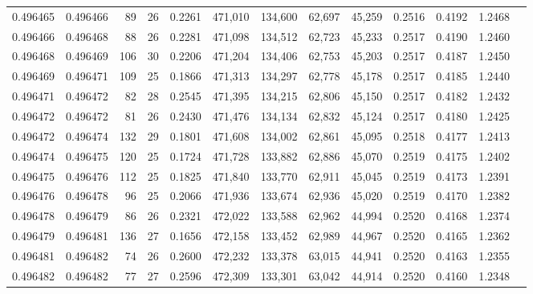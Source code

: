 \begin{tabular}{rrrrrrrrrrrrr}
0.496465 & 0.496466 &  89 &  26 &                                     0.2261 & 471,010 & 134,600 &  62,697 &  45,259 & 0.2516 & 0.4192 & 1.2468 \\
0.496466 & 0.496468 &  88 &  26 &                                     0.2281 & 471,098 & 134,512 &  62,723 &  45,233 & 0.2517 & 0.4190 & 1.2460 \\
0.496468 & 0.496469 & 106 &  30 &                                     0.2206 & 471,204 & 134,406 &  62,753 &  45,203 & 0.2517 & 0.4187 & 1.2450 \\
0.496469 & 0.496471 & 109 &  25 &                                     0.1866 & 471,313 & 134,297 &  62,778 &  45,178 & 0.2517 & 0.4185 & 1.2440 \\
0.496471 & 0.496472 &  82 &  28 &                                     0.2545 & 471,395 & 134,215 &  62,806 &  45,150 & 0.2517 & 0.4182 & 1.2432 \\
0.496472 & 0.496472 &  81 &  26 &                                     0.2430 & 471,476 & 134,134 &  62,832 &  45,124 & 0.2517 & 0.4180 & 1.2425 \\
0.496472 & 0.496474 & 132 &  29 &                                     0.1801 & 471,608 & 134,002 &  62,861 &  45,095 & 0.2518 & 0.4177 & 1.2413 \\
0.496474 & 0.496475 & 120 &  25 &                                     0.1724 & 471,728 & 133,882 &  62,886 &  45,070 & 0.2519 & 0.4175 & 1.2402 \\
0.496475 & 0.496476 & 112 &  25 &                                     0.1825 & 471,840 & 133,770 &  62,911 &  45,045 & 0.2519 & 0.4173 & 1.2391 \\
0.496476 & 0.496478 &  96 &  25 &                                     0.2066 & 471,936 & 133,674 &  62,936 &  45,020 & 0.2519 & 0.4170 & 1.2382 \\
0.496478 & 0.496479 &  86 &  26 &                                     0.2321 & 472,022 & 133,588 &  62,962 &  44,994 & 0.2520 & 0.4168 & 1.2374 \\
0.496479 & 0.496481 & 136 &  27 &                                     0.1656 & 472,158 & 133,452 &  62,989 &  44,967 & 0.2520 & 0.4165 & 1.2362 \\
0.496481 & 0.496482 &  74 &  26 &                                     0.2600 & 472,232 & 133,378 &  63,015 &  44,941 & 0.2520 & 0.4163 & 1.2355 \\
0.496482 & 0.496482 &  77 &  27 &                                     0.2596 & 472,309 & 133,301 &  63,042 &  44,914 & 0.2520 & 0.4160 & 1.2348 \\

\end{tabular}
